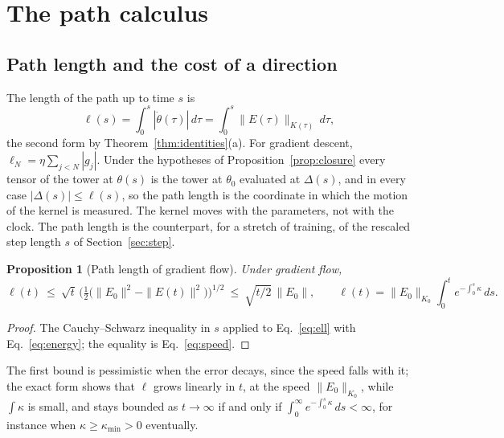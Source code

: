 \documentclass[11pt]{article}
\newtheorem{proposition}{Proposition}
\theoremstyle{definition}
\theoremstyle{remark}
\begin{document}
\section{The path calculus}\label{sec:path}

\subsection{Path length and the cost of a direction}

The length of the path up to time $s$ is
\begin{equation}\label{eq:ell}
\ell(s) = \int_0^s|\dot\theta(\tau)|\,d\tau = \int_0^s\|E(\tau)\|_{K(\tau)}\,d\tau ,
\end{equation}
the second form by Theorem~\ref{thm:identities}(a).
For gradient descent, $\ell_N = \eta\sum_{j<N}|g_j|$.
Under the hypotheses of Proposition~\ref{prop:closure} every tensor of the tower at $\theta(s)$ is the tower at $\theta_0$ evaluated at $\Delta(s)$, and in every case $|\Delta(s)|\le\ell(s)$, so the path length is the coordinate in which the motion of the kernel is measured.
The kernel moves with the parameters, not with the clock.
The path length is the counterpart, for a stretch of training, of the rescaled step length $s$ of Section~\ref{sec:step}.

\begin{proposition}[Path length of gradient flow]\label{prop:ell}
Under gradient flow,
\begin{equation}\label{eq:ellbound}
\ell(t)\ \le\ \sqrt{t}\,\Big(\tfrac12\big(\|E_0\|^2 - \|E(t)\|^2\big)\Big)^{1/2}\ \le\ \sqrt{t/2}\,\|E_0\| ,
\qquad
\ell(t) = \|E_0\|_{K_0}\int_0^te^{-\int_0^s\kappa}\,ds .
\end{equation}
\end{proposition}

\begin{proof}
The Cauchy--Schwarz inequality in $s$ applied to Eq.~\eqref{eq:ell} with Eq.~\eqref{eq:energy}; the equality is Eq.~\eqref{eq:speed}.
\end{proof}

The first bound is pessimistic when the error decays, since the speed falls with it; the exact form shows that $\ell$ grows linearly in $t$, at the speed $\|E_0\|_{K_0}$, while $\int\kappa$ is small, and stays bounded as $t\to\infty$ if and only if $\int_0^\infty e^{-\int_0^s\kappa}\,ds < \infty$, for instance when $\kappa\ge\kappa_{\min} > 0$ eventually.
\end{document}
